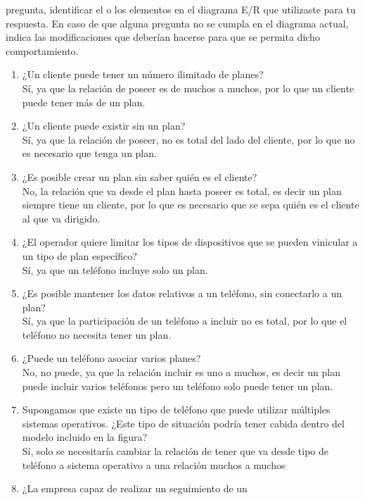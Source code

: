\documentclass[a4paper, 12pt]{report}
\begin{document}
\begin{enumerate}
{\begin{enumerate}
{    	pregunta, identificar el o los elementos en el diagrama E/R 
    	que utilizaste para tu respuesta. En caso de que alguna 
    	pregunta no se cumpla en el diagrama actual, indica las 
    	modificaciones que deberían hacerse para que se permita dicho 
    	comportamiento.\\
    	\begin{enumerate}
    		\item ¿Un cliente puede tener un número ilimitado de planes?\\
    		Sí, ya que la relación de poseer es de muchos a muchos, por
    		lo que un cliente puede tener más de un plan.
    		\item ¿Un cliente puede existir sin un plan?\\
    		Sí, ya que la relación de poseer, no es total del lado del 
    		cliente, por lo que no es necesario que tenga un plan.
    		\item ¿Es posible crear un plan sin saber quién es el 
    		cliente?\\
    		No, la relación que va desde el plan hasta poseer es total,
    		es decir un plan siempre tiene un cliente, por lo que es
    		necesario que se sepa quién es el cliente al que va 
    		dirigido.
    		\item ¿El operador quiere limitar los tipos de dispositivos
    		que se pueden vinicular a un tipo de plan específico?\\
    		Sí, ya que un teléfono incluye solo un plan.
    		\item ¿Es posible mantener los datos relativos a un 
    		teléfono, sin conectarlo a un plan?\\
    		Sí, ya que la participación de un teléfono a incluir no es
    		total, por lo que el teléfono no necesita tener un plan.
    		\item ¿Puede un teléfono asociar varios planes?\\
    		No, no puede, ya que la relación incluir es uno a muchos, 
    		es decir un plan puede incluir varios teléfonos pero un
    		teléfono solo puede tener un plan.
    		\item Supongamos que existe un tipo de teléfono que puede
    		utilizar múltiples sistemas operativos. ¿Este tipo de 
    		situación podría tener cabida dentro del modelo incluido
    		en la figura?\\
    		Sí, solo se necesitaría cambiar la relación de tener que va
    		desde tipo de teléfono a sistema operativo a una relación
    		muchos a muchos
    		\item ¿La empresa capaz de realizar un seguimiento de un 

\end{enumerate}}
\end{enumerate}}
\end{enumerate}
\end{document}

